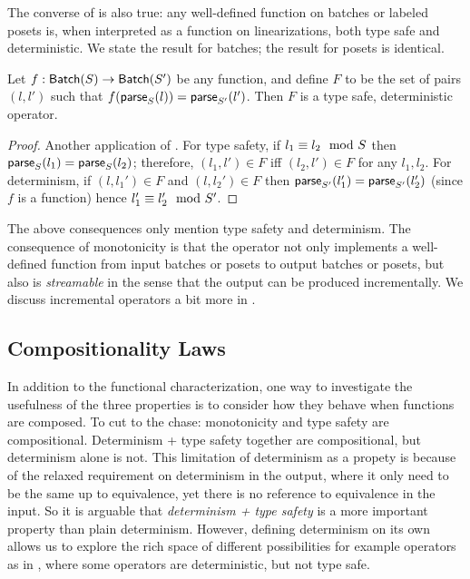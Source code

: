 The converse of  is also true: any well-defined function on batches or labeled posets is, when interpreted as a function on linearizations, both type safe and deterministic. We state the result for batches; the result for posets is identical.
\begin{theorem}
\label{thm:type-safe-and-deterministic-converse}
Let $f: \batch{S} \to \batch{S'}$ be any function, and define $F$
to be the set of pairs $(l, l')$ such that $f(\parselin{l}{S}) = \parselin{l'}{S'}$.
Then $F$ is a type safe, deterministic operator.
\end{theorem}
\begin{proof}
Another application of .
For type safety, if $\equivtype{l_1}{l_2}{S}$ then $\parselin{l_1}{S} = \parselin{l_2}{S}$; therefore, $(l_1, l') \in F$ iff $(l_2, l') \in F$ for any $l_1, l_2$.
For determinism, if $(l, l_1') \in F$ and $(l, l_2') \in F$ then $\parselin{l_1'}{S'} = \parselin{l_2'}{S'}$ (since $f$ is a function) hence $\equivtype{l_1'}{l_2'}{S'}$.
\end{proof}

The above consequences only mention type safety and determinism.
The consequence of monotonicity is that the operator not only implements a well-defined function from input batches or posets to output batches or posets, but also is \emph{streamable} in the sense that the output can be produced incrementally.
We discuss incremental operators a bit more in .

\subsection{Compositionality Laws}
\label{sec:compositionality-laws}

In addition to the functional characterization, one way to investigate
the usefulness of the three properties is to consider how they behave when functions are composed.
To cut to the chase: monotonicity and type safety are compositional.
Determinism + type safety together are compositional, but determinism alone is not.
This limitation of determinism as a propety is because of the relaxed requirement on determinism in the output, where it only need to be the same up to equivalence, yet there is no reference to equivalence in the input.
So it is arguable that \emph{determinism + type safety} is a more important property than plain determinism. However, defining determinism on its own allows us to explore the rich space of different possibilities for example operators as in , where some operators are deterministic, but not type safe.

